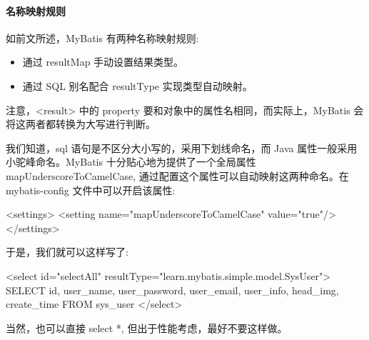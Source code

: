 \paragraph*{名称映射规则} 如前文所述，MyBatis 有两种名称映射规则:
\begin{itemize}
    \item 通过 resultMap 手动设置结果类型。
    \item 通过 SQL 别名配合 resultType 实现类型自动映射。
\end{itemize}

注意，<result> 中的 property 要和对象中的属性名相同，而实际上，MyBatis 会将这两者都转换为大写进行判断。

我们知道，sql 语句是不区分大小写的，采用下划线命名，而 Java 属性一般采用小驼峰命名。MyBatis 十分贴心地为提供了一个全局属性 mapUnderscoreToCamelCase, 通过配置这个属性可以自动映射这两种命名。在 mybatis-config 文件中可以开启该属性:

\begin{xml}
<settings>
    <setting name="mapUnderscoreToCamelCase" value="true"/>
</settings>
\end{xml}

于是，我们就可以这样写了:
\begin{xml}
<select id="selectAll" resultType="learn.mybatis.simple.model.SysUser">
    SELECT id,
           user_name,
           user_password,
           user_email,
           user_info,
           head_img,
           create_time
    FROM sys_user
</select>
\end{xml}

当然，也可以直接 select *, 但出于性能考虑，最好不要这样做。


\newpage